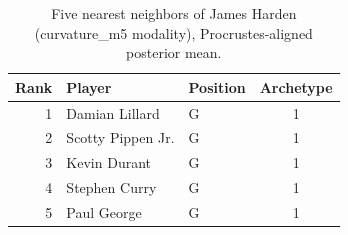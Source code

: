 \begin{table}[htbp]
  \centering\small
  \begin{tabular}{rllc}
    \toprule
    Rank & Player & Position & Archetype \\
    \midrule
    1 & Damian Lillard & G & 1 \\
    2 & Scotty Pippen Jr. & G & 1 \\
    3 & Kevin Durant & G & 1 \\
    4 & Stephen Curry & G & 1 \\
    5 & Paul George & G & 1 \\
    \bottomrule
  \end{tabular}
  \caption{Five nearest neighbors of James Harden (curvature_m5 modality), Procrustes-aligned posterior mean.}
  \label{tab:James_Harden_neighbors_curvature_m5}
\end{table}

